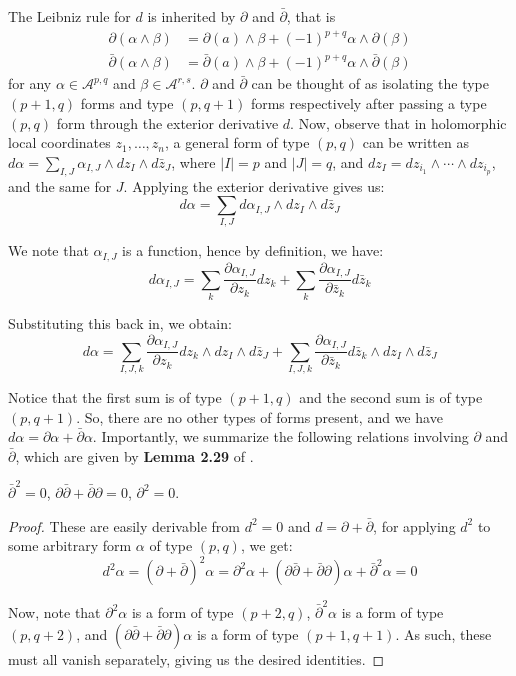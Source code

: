 \noindent The Leibniz rule for $d$ is inherited by $\partial$ and $\bar \partial$, that is
\begin{align*}
    \partial(\alpha \wedge \beta) &= \partial(a)\wedge \beta +(-1)^{p+q} \alpha\wedge \partial(\beta) \\
    \bar\partial(\alpha \wedge \beta) &= \bar\partial(a)\wedge \beta +(-1)^{p+q} \alpha\wedge \bar\partial(\beta)
\end{align*}
for any $\alpha\in \mathcal{A}^{p,q}$ and $\beta\in \mathcal{A}^{r,s}$. $\partial$ and $\bar\partial$ can be thought of as isolating the type $(p+1,q)$ forms and type $(p,q+1)$ forms respectively after passing a type $(p,q)$ form through the exterior derivative $d$. Now, observe that in holomorphic local coordinates $z_1,\ldots, z_n$, a general form of type $(p,q)$ can be written as $d\alpha = \sum_{I,J}\alpha_{I,J}\wedge dz_I \wedge d\bar z_J$, where $|I|=p$ and $|J|=q$, and $dz_I = dz_{i_1}\wedge \cdots \wedge dz_{i_p}$, and the same for $J$. Applying the exterior derivative gives us:
$$
d\alpha = \sum_{I,J}d\alpha_{I,J}\wedge dz_I \wedge d\bar z_J
$$

\noindent We note that $\alpha_{I,J}$ is a function, hence by definition, we have:
$$
d\alpha_{I,J} = \sum_{k}\frac{\partial \alpha_{I,J}}{\partial z_k}dz_k + \sum_{k} \frac{\partial\alpha_{I,J}}{\partial \bar z_k}d\bar z_k
$$

\noindent Substituting this back in, we obtain:
$$
d\alpha =\sum_{I,J,k}\frac{\partial \alpha_{I,J}}{\partial z_k}dz_k\wedge dz_I \wedge d\bar z_J + \sum_{I,J,k} \frac{\partial\alpha_{I,J}}{\partial \bar z_k}d\bar z_k \wedge dz_I \wedge d\bar z_J
$$

\noindent Notice that the first sum is of type $(p+1,q)$ and the second sum is of type $(p,q+1)$. So, there are no other types of forms present, and we have $d\alpha = \partial \alpha + \bar\partial \alpha$. Importantly, we summarize the following relations involving $\partial$ and $\bar \partial$, which are given by \textbf{Lemma 2.29} of \cite{VoisinI2002}.
\begin{lemma}
    $\bar\partial^2 =0$, $\partial\bar\partial + \bar\partial \partial =0$, $\partial^2=0$.
\end{lemma}
\begin{proof}
    These are easily derivable from $d^2=0$ and $d=\partial + \bar\partial$, for applying $d^2$ to some arbitrary form $\alpha$ of type $(p,q)$, we get:
$$
d^2\alpha = (\partial + \bar\partial)^2 \alpha = \partial^2 \alpha + (\partial\bar\partial + \bar\partial \partial)\alpha + \bar\partial^2 \alpha = 0
$$

\noindent Now, note that $\partial^2\alpha$ is a form of type $(p+2,q)$, $\bar\partial^2\alpha$ is a form of type $(p,q+2)$, and $(\partial\bar\partial + \bar\partial \partial)\alpha$ is a form of type $(p+1,q+1)$. As such, these must all vanish separately, giving us the desired identities. 
\end{proof}

